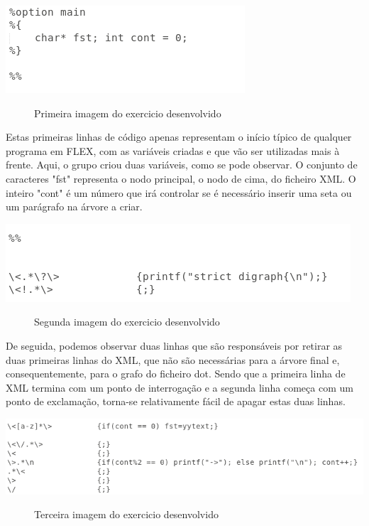 \documentclass[a4paper]{article}
\begin{document}
\begin{center}
	\includegraphics[scale=0.8]{flex1}
	\begin{figure}[!ht]
	\caption{Primeira imagem do exercicio desenvolvido}
	\end{figure}
\end{center}

Estas primeiras linhas de código apenas representam o início típico de qualquer programa em FLEX, com as variáveis criadas e que vão ser utilizadas mais à frente.
Aqui, o grupo criou duas variáveis, como se pode observar. O conjunto de caracteres "fst" representa o nodo principal, o nodo de cima, do ficheiro XML. O inteiro "cont" é um número que irá controlar se é necessário inserir uma seta ou um parágrafo na árvore a criar.

\begin{center}
	\includegraphics[scale=0.65]{flex2}
	\begin{figure}[!ht]
	\caption{Segunda imagem do exercicio desenvolvido}
	\end{figure}
\end{center}

De seguida, podemos observar duas linhas que são responsáveis por retirar as duas primeiras linhas do XML, que não são necessárias para a árvore final e, consequentemente, para o grafo do ficheiro dot.
Sendo que a primeira linha de XML termina com um ponto de interrogação e a segunda linha começa com um ponto de exclamação, torna-se relativamente fácil de apagar estas duas linhas.

\vspace{75px}
\begin{center}
	\includegraphics[scale=0.55]{flex3}
	\begin{figure}[!ht]
	\caption{Terceira imagem do exercicio desenvolvido}
	\end{figure}
\end{center}
\end{document}
